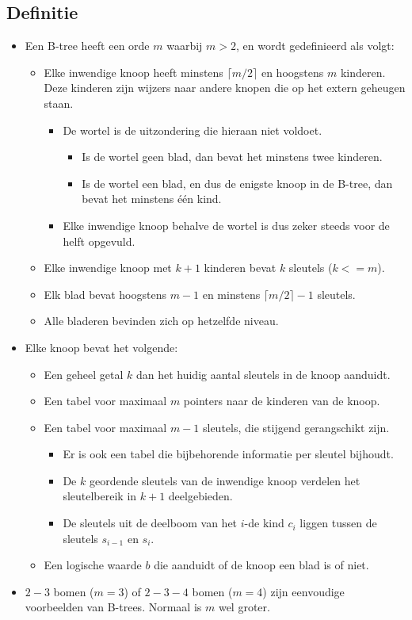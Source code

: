 \subsection{Definitie}
\begin{itemize}
    \item Een B-tree heeft een orde $m$ waarbij $m > 2$, en wordt gedefinieerd als volgt:
    \begin{itemize}
        \item Elke inwendige knoop heeft minstens $\lceil m/2 \rceil$ en hoogstens $m$ kinderen. Deze kinderen zijn wijzers naar andere knopen die op het extern geheugen staan.
        \begin{itemize}
            \item De wortel is de uitzondering die hieraan niet voldoet.
            \begin{itemize}
                \item Is de wortel geen blad, dan bevat het minstens twee kinderen.
                \item Is de wortel een blad, en dus de enigste knoop in de B-tree, dan bevat het minstens één kind.
            \end{itemize}
            \item Elke inwendige knoop behalve de wortel is dus zeker steeds voor de helft opgevuld.
        \end{itemize}
        \item Elke inwendige knoop met $k + 1$ kinderen bevat $k$ sleutels ($k <= m$). 
        \item Elk blad bevat hoogstens $m - 1$ en minstens $\lceil m/2 \rceil - 1$  sleutels.
        \item Alle bladeren bevinden zich op hetzelfde niveau.
    \end{itemize}
    \item Elke knoop bevat het volgende:
    \begin{itemize}
        \item Een geheel getal $k$ dan het huidig aantal sleutels in de knoop aanduidt.
        \item Een tabel voor maximaal $m$ pointers naar de kinderen van de knoop.
        \item Een tabel voor maximaal $m - 1$ sleutels, die stijgend gerangschikt zijn.
        \begin{itemize}
            \item Er is ook een tabel die bijbehorende informatie per sleutel bijhoudt.
            \item De $k$ geordende sleutels van de inwendige knoop verdelen het sleutelbereik in $k + 1$ deelgebieden.
            \item De sleutels uit de deelboom van het $i$-de kind $c_i$ liggen tussen de sleutels $s_{i - 1}$ en $s_i$.
        \end{itemize} 
        \item Een logische waarde $b$ die aanduidt of de knoop een blad is of niet.
    \end{itemize}
    \item $2-3$ bomen ($m=3$) of $2-3-4$ bomen ($m=4$) zijn eenvoudige voorbeelden van B-trees. Normaal is $m$ wel groter.
\end{itemize}

